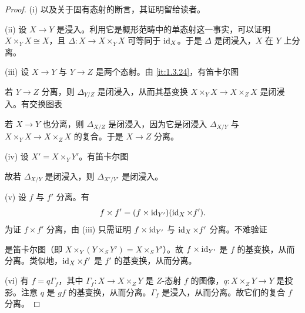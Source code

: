 \begin{proof}
(i) 以及关于固有态射的断言，其证明留给读者。

(ii) 设 $X\to Y$ 是浸入。利用它是概形范畴中的单态射这一事实，可以证明 $X\times_Y X\cong X$，且 $\Delta\colon X\to X\times_Y X$ 可等同于 $\operatorname{id}_X$。于是 $\Delta$ 是闭浸入，$X$ 在 $Y$ 上分离。

(iii) 设 $X\to Y$ 与 $Y\to Z$ 是两个态射。由 \ref{it:1.3.24}，有笛卡尔图
\begin{center}
\end{center}
若 $Y\to Z$ 分离，则 $\Delta_{Y/Z}$ 是闭浸入，从而其基变换 $X\times_Y X\to X\times_Z X$ 是闭浸入。有交换图表
\begin{center}
\end{center}
若 $X\to Y$ 也分离，则 $\Delta_{X/Z}$ 是闭浸入，因为它是闭浸入 $\Delta_{X/Y}$ 与 $X\times_Y X\to X\times_Z X$ 的复合。于是 $X\to Z$ 分离。

(iv) 设 $X'=X\times_Y Y'$。有笛卡尔图
\begin{center}
\end{center}
故若 $\Delta_{X/Y}$ 是闭浸入，则 $\Delta_{X'/Y'}$ 是闭浸入。

(v) 设 $f$ 与 $f'$ 分离。有
\[
f\times f'=(f\times\operatorname{id}_{Y'})(\operatorname{id}_X\times f').
\]
为证 $f\times f'$ 分离，由 (iii) 只需证明 $f\times\operatorname{id}_{Y'}$ 与 $\operatorname{id}_X\times f'$ 分离。不难验证
\begin{center}
\end{center}
是笛卡尔图（即 $X\times_Y(Y\times_S Y')=X\times_S Y'$）。故 $f\times\operatorname{id}_{Y'}$ 是 $f$ 的基变换，从而分离。类似地，$\operatorname{id}_X\times f'$ 是 $f'$ 的基变换，从而分离。

(vi) 有 $f=q\Gamma_f$，其中 $\Gamma_f\colon X\to X\times_Z Y$ 是 $Z$-态射 $f$ 的图像，$q\colon X\times_Z Y\to Y$ 是投影。注意 $q$ 是 $gf$ 的基变换，从而分离。$\Gamma_f$ 是浸入，从而分离。故它们的复合 $f$ 分离。
\end{proof}

